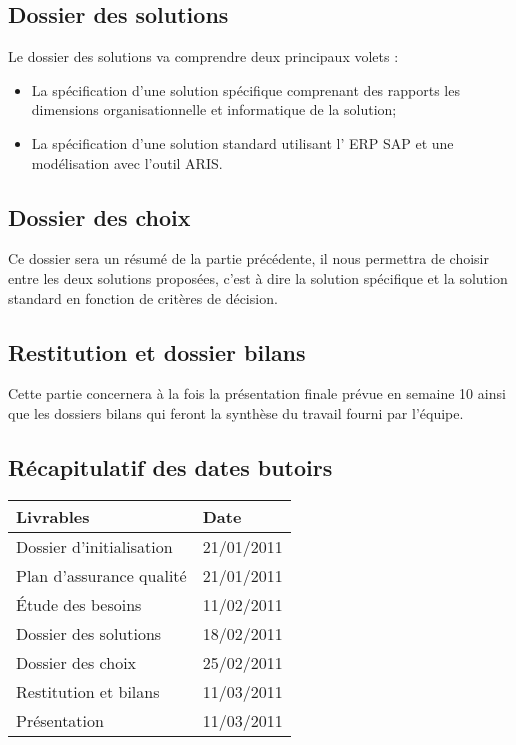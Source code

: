 \documentclass[twoside]{article}
\begin{document}
\subsection{Dossier des solutions}

Le dossier des solutions va comprendre deux principaux volets :
\begin{itemize}
    \item La spécification d'une solution spécifique comprenant des rapports
        les dimensions organisationnelle et informatique de la solution;
    \item La spécification d'une solution standard utilisant l' ERP SAP et une
        modélisation avec l'outil ARIS.
\end{itemize}

\subsection{Dossier des choix}

Ce dossier sera un résumé de la partie précédente, il nous permettra de choisir
entre les deux solutions proposées, c'est à dire la solution spécifique et la
solution standard en fonction de critères de décision. 

\subsection{Restitution et dossier bilans}

Cette partie concernera à la fois la présentation finale prévue en semaine 10
ainsi que les dossiers bilans qui feront la synthèse du travail fourni par l'équipe.

\subsection{Récapitulatif des dates butoirs}

\begin{longtable}{|l|l|}
\hline
Livrables& Date\\
\endhead \hline
Dossier d'initialisation& 21/01/2011\\
\hline
Plan d'assurance qualité& 21/01/2011\\
\hline
Étude des besoins& 11/02/2011\\
\hline
Dossier des solutions& 18/02/2011\\
\hline
Dossier des choix& 25/02/2011\\
\hline
Restitution et bilans& 11/03/2011\\
\hline
Présentation&  11/03/2011\\
\hline
\end{longtable}
\end{document}
